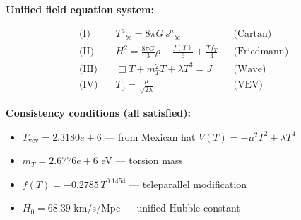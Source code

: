 
\textbf{Unified field equation system:}

\begin{align}
  \text{(I)} \quad & T^a{}_{bc} = 8\pi G \, s^a{}_{bc} && \text{(Cartan)} \\
  \text{(II)} \quad & H^2 = \frac{8\pi G}{3}\rho - \frac{f(T)}{6} + \frac{Tf_T}{3} && \text{(Friedmann)} \\
  \text{(III)} \quad & \Box T + m_T^2 T + \lambda T^3 = J && \text{(Wave)} \\
  \text{(IV)} \quad & T_0 = \frac{\mu}{\sqrt{2\lambda}} && \text{(VEV)}
\end{align}

\textbf{Consistency conditions (all satisfied):}
\begin{itemize}
  \item $T_{\text{vev}} = 2.3180e+6$ — from Mexican hat $V(T) = -\mu^2 T^2 + \lambda T^4$
  \item $m_T = 2.6776e+6$ eV — torsion mass
  \item $f(T) = -0.2785 \, T^{0.1454}$ — teleparallel modification
  \item $H_0 = 68.39$ km/s/Mpc — unified Hubble constant
\end{itemize}